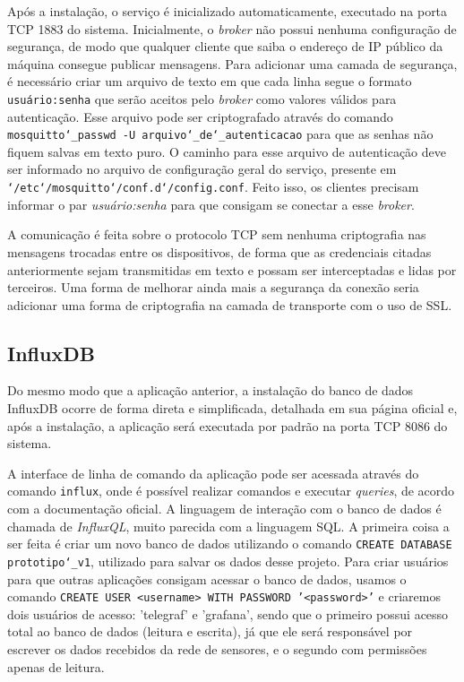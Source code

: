 \documentclass[../monografia.tex]{subfiles}
\begin{document}
Após a instalação, o serviço é inicializado automaticamente, executado na porta TCP 1883 do sistema. Inicialmente, o \textit{broker} não possui nenhuma configuração de segurança, de modo que qualquer cliente que saiba o endereço de IP público da máquina consegue publicar mensagens. Para adicionar uma camada de segurança, é necessário criar um arquivo de texto em que cada linha segue o formato \texttt{usuário:senha} que serão aceitos pelo \textit{broker} como valores válidos para autenticação. Esse arquivo pode ser criptografado através do comando \texttt{mosquitto\char`_passwd -U arquivo\char`_de\char`_autenticacao} para que as senhas não fiquem salvas em texto puro. O caminho para esse arquivo de autenticação deve ser informado no arquivo de configuração geral do serviço, presente em \texttt{\char`/etc\char`/mosquitto\char`/conf.d\char`/config.conf}. Feito isso, os clientes precisam informar o par \textit{usuário:senha} para que consigam se conectar a esse \textit{broker}.

A comunicação é feita sobre o protocolo TCP sem nenhuma criptografia nas mensagens trocadas entre os dispositivos, de forma que as credenciais citadas anteriormente sejam transmitidas em texto e possam ser interceptadas e lidas por terceiros. Uma forma de melhorar ainda mais a segurança da conexão seria adicionar uma forma de criptografia na camada de transporte com o uso de SSL.

\subsection{InfluxDB}

Do mesmo modo que a aplicação anterior, a instalação do banco de dados InfluxDB ocorre de forma direta e simplificada, detalhada em sua página oficial \cite{influxdb-installation} e, após a instalação, a aplicação será executada por padrão na porta TCP 8086 do sistema. 

A interface de linha de comando da aplicação pode ser acessada através do comando \texttt{influx}, onde é possível realizar comandos e executar \textit{queries}, de acordo com a documentação oficial. A linguagem de interação com o banco de dados é chamada de \textit{InfluxQL}, muito parecida com a linguagem SQL. A primeira coisa a ser feita é criar um novo banco de dados utilizando o comando \texttt{CREATE DATABASE prototipo\char`_v1}, utilizado para salvar os dados desse projeto. Para criar usuários para que outras aplicações consigam acessar o banco de dados, usamos o comando \texttt{CREATE USER <username> WITH PASSWORD '<password>'} e criaremos dois usuários de acesso: 'telegraf' e 'grafana', sendo que o primeiro possui acesso total ao banco de dados (leitura e escrita), já que ele será responsável por escrever os dados recebidos da rede de sensores, e o segundo com permissões apenas de leitura. 
\end{document}
